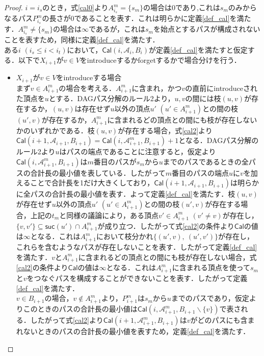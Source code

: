 \documentclass[master]{kuisthesis}		%
\theoremstyle{plain}
\theoremstyle{definition}
\begin{document}
{\begin{proof}
    $i=i_s$のとき，式\ref{cal0}より$A^m_{i_s} = \{s_m\}$の場合は0であり,これは$s_m$のみからなるパス$P^m_{i_s}$の長さが0であることを表す．これは明らかに定義\ref{def_cal}を満たす．$A^m_{i_s} \neq \{s_m\}$の場合は$\infty$であるが，これは$s_m$を始点とするパスが構成されないことを表すため，同様に定義\ref{def_cal}を満たす．\\
    ある$i$ $(i_s \leq i < i_t)$において，$\mathsf{Cal}(i, \mathscr{A}_i, B_i)$が定義\ref{def_cal}を満たすと仮定する．以下で$X_{i+1}$が$v \in V$をintroduceするかforgetするかで場合分けを行う．
    \begin{itemize}
        \item $X_{i+1}$が$v \in V$をintroduceする場合 \\
        まず$v \in A^m_{i+1}$の場合を考える．$A^m_{i+1}$に含まれ，かつ$v$の直前にintroduceされた頂点を$u$とする．DAGパス分解のルール2より，$u, v$の間には枝$(u, v)$が存在するか，$(u, v)$は存在せず$u$以外の頂点$u'$ $(u' \in A^m_{i+1})$との間の枝$(u', v)$が存在するか，$A^m_{i+1}$に含まれるどの頂点との間にも枝が存在しないかのいずれかである．枝$(u, v)$が存在する場合，式\ref{cal2}より$\mathsf{Cal}(i+1, \mathscr{A}_{i+1}, B_{i+1}) = \mathsf{Cal}(i, \mathscr{A}^m_{i+1}, B_{i+1})+1$となる．DAGパス分解のルール2より$u$はパスの端点であることに注意すると，仮定より$\mathsf{Cal}(i, \mathscr{A}^m_{i+1}, B_{i+1})$は$m$番目のパスが$s_m$から$u$までのパスであるときの全パスの合計長の最小値を表している．したがって$m$番目のパスの端点$u$に$v$を加えることで合計長を1だけ大きくしており，$\mathsf{Cal}(i+1, \mathscr{A}_{i+1}, B_{i+1})$は明らかに全パスの合計長の最小値を表す．よって定義\ref{def_cal}を満たす．枝$(u, v)$が存在せず$u$以外の頂点$u'$ $(u' \in A^m_{i+1})$との間の枝$(u', v)$が存在する場合，上記の$t_m$と同様の議論により，ある頂点$v' \in A^m_{i+1}$ $(v' \neq v)$が存在し，$\{v, v'\} \subseteq \mathsf{suc}(u') \cap A^m_{i+1}$が成り立つ．したがって式\ref{cal2}の条件より$\mathsf{Cal}$の値は$\infty$となる．これは$A^m_{i+1}$において枝分かれ$\{(u', v),\ (u', v')\}$が存在し，これらを含むようなパスが存在しないことを表す．したがって定義\ref{def_cal}を満たす．$v$と$A^m_{i+1}$に含まれるどの頂点との間にも枝が存在しない場合，式\ref{cal2}の条件より$\mathsf{Cal}$の値は$\infty$となる．これは$A^m_{i+1}$に含まれる頂点を使って$s_m$と$v$をつなぐパスを構成することができないことを表す．したがって定義\ref{def_cal}を満たす．\\
        $v \in B_{i+1}$の場合，$v \notin A^m_{i+1}$より，$P^m_{i+1}$は$s_m$から$u$までのパスであり，仮定よりこのときのパスの合計長の最小値は$\mathsf{Cal}(i, \mathscr{A}^m_{i+1}, B_{i+1} \backslash \{v\})$で表される．したがって式\ref{cal2}より$\mathsf{Cal}(i+1, \mathscr{A}^m_{i+1}, B_{i+1})$は$v$がどのパスにも含まれないときのパスの合計長の最小値を表すため，定義\ref{def_cal}を満たす．\\

\end{itemize}
\end{proof}}
\end{document}

